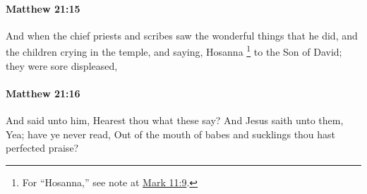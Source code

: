 		\paragraph{Matthew 21:15} %
			\label{MATTHEW-21-15}

			And when the chief priests and scribes saw the wonderful things that he did, and the children crying in the temple, and saying, Hosanna%
				\footnote{%
					For ``Hosanna,'' see note at \hyperref[MARK-11-9]{Mark 11:9}.
					}
			to the Son of David; they were sore displeased,

			\begin{framed}
			\scriptsize
				\begin{compactdesc}
					\item[SBLG] 
				\end{compactdesc}
			\end{framed}

		\paragraph{Matthew 21:16} %
			\label{MATTHEW-21-16}

			And said unto him, Hearest thou what these say? And Jesus saith unto them, Yea; have ye never read, Out of the mouth of babes and sucklings thou hast perfected praise?

